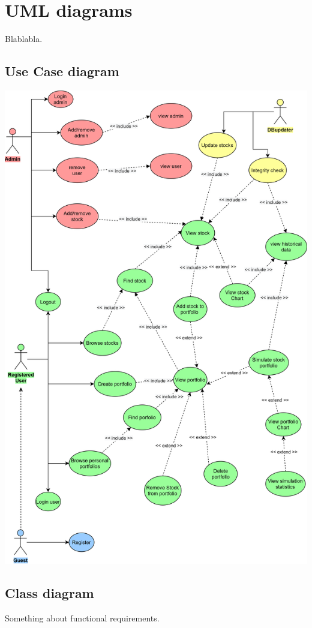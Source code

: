 \chapter{UML diagrams}
Blablabla.

\section{Use Case diagram}

\includegraphics[scale=0.15]{img/use_case.png}

\section{Class diagram}
Something about functional requirements.
